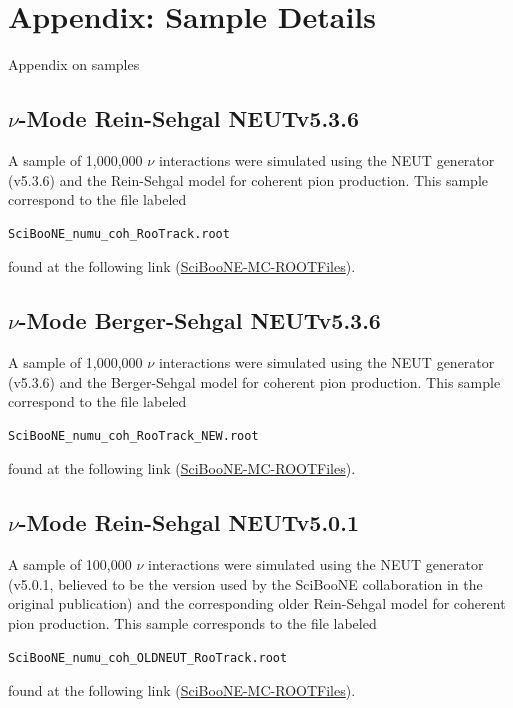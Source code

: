 \documentclass[11pt]{article}
\begin{document}
\section{Appendix: Sample Details}\label{sec:SampleAppendix}

Appendix on samples

\subsection{$\nu$-Mode Rein-Sehgal NEUTv5.3.6}
A sample of 1,000,000 $\nu$ interactions were simulated using the NEUT generator (v5.3.6) and the Rein-Sehgal model for coherent pion production. This sample correspond to the file labeled 
\begin{verbatim}
SciBooNE_numu_coh_RooTrack.root
\end{verbatim}
found at the following link (\href{https://drive.google.com/open?id=0B4rvJl9swUOxcEtpSl94RDRsc3c}{SciBooNE-MC-ROOTFiles}).

\subsection{$\nu$-Mode Berger-Sehgal NEUTv5.3.6}
A sample of 1,000,000 $\nu$ interactions were simulated using the NEUT generator (v5.3.6) and the Berger-Sehgal model for coherent pion production. This sample correspond to the file labeled
\begin{verbatim}
SciBooNE_numu_coh_RooTrack_NEW.root
\end{verbatim}
found at the following link (\href{https://drive.google.com/open?id=0B4rvJl9swUOxcEtpSl94RDRsc3c}{SciBooNE-MC-ROOTFiles}).



\subsection{$\nu$-Mode Rein-Sehgal NEUTv5.0.1}
A sample of 100,000 $\nu$ interactions were simulated using the NEUT generator (v5.0.1, believed to be the version used by the SciBooNE collaboration in the original publication) and the corresponding older Rein-Sehgal model for coherent pion production. This sample corresponds to the file labeled
\begin{verbatim}
SciBooNE_numu_coh_OLDNEUT_RooTrack.root
\end{verbatim}
found at the following link (\href{https://drive.google.com/open?id=0B4rvJl9swUOxcEtpSl94RDRsc3c}{SciBooNE-MC-ROOTFiles}).
\end{document}
